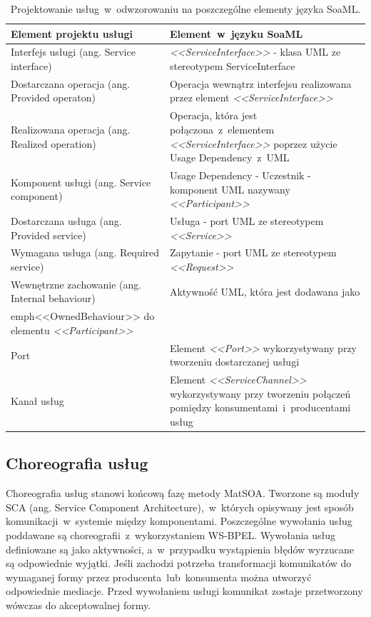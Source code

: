 \begin{table}[!htbp]
\begin{center}
\begin{small}
\begin{supertabular}{|p{6cm}|p{7cm}|}\hline
\textbf{Element projektu usługi} & \textbf{Element~w~języku SoaML}\\\hline
Interfejs usługi (ang. Service interface) &	\emph{<<ServiceInterface>>} - klasa UML ze stereotypem  ServiceInterface  \\\hline
Dostarczana operacja (ang. Provided operaton) &	Operacja wewnątrz interfejsu realizowana przez element \emph{<<ServiceInterface>>} \\\hline
Realizowana operacja (ang. Realized operation) &	Operacja, która jest połączona~z~elementem \emph{<<ServiceInterface>>} poprzez użycie Usage Dependency~z~UML \\\hline
Komponent usługi (ang. Service component) &	Usage Dependency - Uczestnik - komponent UML nazywany \emph{<<Participant>>} \\\hline
Dostarczana usługa (ang. Provided service) &	Usługa - port UML ze stereotypem \emph{<<Service>>}  \\\hline
Wymagana usługa (ang. Required service) &	Zapytanie - port UML ze stereotypem \emph{<<Request>>} \\\hline
Wewnętrzne zachowanie (ang. Internal behaviour) &	Aktywność UML, która jest dodawana jako \\emph{<<OwnedBehaviour>>} do elementu \emph{<<Participant>>} \\\hline
Port &	Element \emph{<<Port>>} wykorzystywany przy tworzeniu dostarczanej usługi\\\hline
Kanał usług &	Element \emph{<<ServiceChannel>>} wykorzystywany przy tworzeniu połączeń pomiędzy konsumentami~i~producentami usług\\\hline
\end{supertabular}
\end{small}
\end{center}
 \caption{Projektowanie usług~w~odwzorowaniu na poszczególne elementy języka SoaML.}
 \label{tabela_service_projects_soaml}
\end{table}

\subsection{Choreografia usług}
Choreografia usług stanowi końcową fazę metody MatSOA. Tworzone są moduły SCA (ang. Service Component Architecture),~w~których opisywany jest sposób komunikacji~w~systemie między komponentami. Poszczególne wywołania usług poddawane są choreografii~z~wykorzystaniem WS-BPEL. Wywołania usług definiowane są jako aktywności, a~w~przypadku wystąpienia błędów wyrzucane są odpowiednie wyjątki. Jeśli zachodzi potrzeba transformacji komunikatów do wymaganej formy przez producenta~lub~konsumenta można utworzyć odpowiednie mediacje. Przed wywołaniem usługi komunikat zostaje przetworzony wówczas do akceptowalnej formy.


